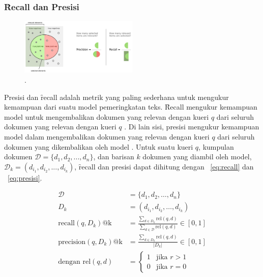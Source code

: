         \subsubsection{\f{Recall} dan Presisi}

        \begin{figure}
            \centering
            \includegraphics[width=0.50\textwidth]{assets/pics/recall-presisi.png}
            \caption{\license.}
            \label{fig:recall-precision}
        \end{figure}
        

        
        Presisi dan \f{recall} adalah metrik yang paling sederhana untuk mengukur kemampuan dari suatu model pemeringkatan teks. \f{Recall} mengukur kemampuan model untuk mengembalikan dokumen yang relevan dengan kueri $q$ dari seluruh dokumen yang relevan dengan kueri $q$ \citep{textrankingsurvey}. Di lain sisi, presisi mengukur kemampuan model dalam mengembalikan dokumen yang relevan dengan kueri $q$ dari seluruh dokumen yang dikembalikan oleh model \citep{textrankingsurvey}. Untuk suatu kueri $q$, kumpulan dokumen $\mathcal{D} = \{d_1, d_2, ..., d_n\}$, dan barisan $k$ dokumen yang diambil oleh model, $\mathcal{D}_k = (d_{i_1}, d_{i_2}, ..., d_{i_k})$, \f{recall} dan presisi dapat dihitung dengan \equ~\ref{eq:recall} dan \equ~\ref{eq:presisi}.

        \begin{align}
            \label{eq:recall}
            \mathcal{D} &= \{d_1, d_2, \dots, d_n\} \\
            D_k &= (d_{i_1}, d_{i_2}, \dots, d_{i_k}) \\
            \text{recall}(q, D_k)\text{@k} &= \frac{\sum_{d \in D_k} \text{rel}(q, d)}{\sum_{d \in \mathcal{D}} \text{rel}(q, d)} \in [0, 1] \\
            \label{eq:presisi}
            \text{precision}(q, D_k)\text{@k} &= \frac{\sum_{d \in D_k} \text{rel}(q, d)}{|D_k|} \in [0, 1] \\
            \label{eq:rel}
            \text{dengan } \text{rel}(q, d) &= \begin{cases} 
            1 & \text{jika } r > 1 \\
            0 & \text{jika } r = 0
            \end{cases}        
        \end{align}


